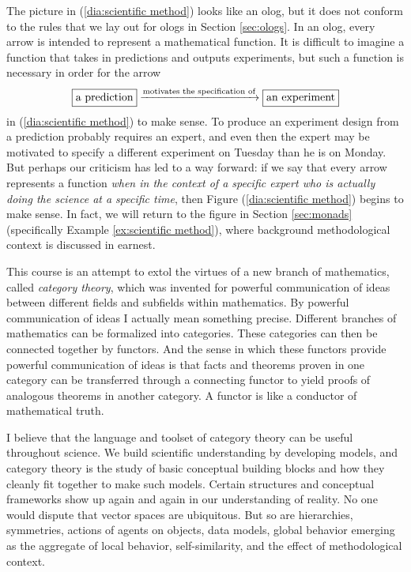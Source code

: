 \documentclass{book}
\def\tn{\textnormal}
\newcommand{\To}[1]{\xrightarrow{#1}}
\theoremstyle{remark}
\theoremstyle{definition}
\begin{document}
The picture in (\ref{dia:scientific method}) looks like an olog, but it does not conform to the rules that we lay out for ologs in Section \ref{sec:ologs}. In an olog, every arrow is intended to represent a mathematical function. It is difficult to imagine a function that takes in predictions and outputs experiments, but such a function is necessary in order for the arrow
$$\fbox{a prediction}\To{\tn{motivates the specification of}}\fbox{an experiment}
$$
in (\ref{dia:scientific method}) to make sense. To produce an experiment design from a prediction probably requires an expert, and even then the expert may be motivated to specify a different experiment on Tuesday than he is on Monday. But perhaps our criticism has led to a way forward: if we say that every arrow represents a function {\em when in the context of a specific expert who is actually doing the science at a specific time}, then Figure (\ref{dia:scientific method}) begins to make sense. In fact, we will return to the figure in Section \ref{sec:monads} (specifically Example \ref{ex:scientific method}), where background methodological context is discussed in earnest.

This course is an attempt to extol the virtues of a new branch of mathematics, called {\em category theory}, which was invented for powerful communication of ideas between different fields and subfields within mathematics. By powerful communication of ideas I actually mean something precise. Different branches of mathematics can be formalized into categories. These categories can then be connected together by functors. And the sense in which these functors provide powerful communication of ideas is that facts and theorems proven in one category can be transferred through a connecting functor to yield proofs of analogous theorems in another category. A functor is like a conductor of mathematical truth.

I believe that the language and toolset of category theory can be useful throughout science. We build scientific understanding by developing models, and category theory is the study of basic conceptual building blocks and how they cleanly fit together to make such models. Certain structures and conceptual frameworks show up again and again in our understanding of reality. No one would dispute that vector spaces are ubiquitous. But so are hierarchies, symmetries, actions of agents on objects, data models, global behavior emerging as the aggregate of local behavior, self-similarity, and the effect of methodological context. 
\end{document}

